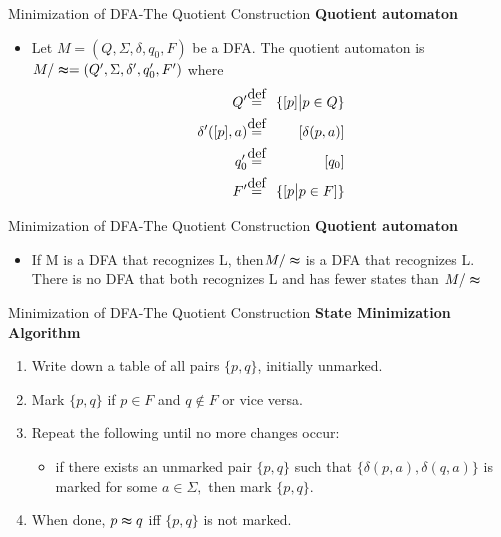 \documentclass{beamer}
\begin{document}
\begin{frame}{Minimization of DFA-The Quotient Construction}
	\textbf{Quotient automaton}
	\begin{itemize}
		\item Let $M = (Q, \Sigma, \delta, q_0, F)$ be a DFA. The quotient automaton is $M / \thickapprox = (Q', \Sigma, \delta', q'_0 , F')$ where
		\begin{eqnarray*}
			Q'&\stackrel{\mathclap{\normalfont\mbox{def}}}{=}& \{ [p]\big| p\in Q \}\\
			\delta'([p],a)&\stackrel{\mathclap{\normalfont\mbox{def}}}{=}& [\delta(p,a)]\\
			q_0'&\stackrel{\mathclap{\normalfont\mbox{def}}}{=}& [q_0]\\
			F'&\stackrel{\mathclap{\normalfont\mbox{def}}}{=}& \{[p \big| p\in F]\}
		\end{eqnarray*}
	\end{itemize}
\end{frame}
\begin{frame}{Minimization of DFA-The Quotient Construction}
	\textbf{Quotient automaton}
	\begin{itemize}
		\item If M is a DFA that recognizes L, then$M/\thickapprox$  is a DFA that recognizes L. There is no DFA that both recognizes L and has fewer states than $M/\thickapprox$
	\end{itemize}
\end{frame}
\begin{frame}{Minimization of DFA-The Quotient Construction}
	\textbf{State Minimization Algorithm}
	\begin{enumerate}
		\item Write down a table of all pairs $\{p, q\}$, initially unmarked.
		\item Mark $\{p, q\}$ if $p \in F$ and $q \notin F$ or vice versa.
		\item Repeat the following until no more changes occur: 
		\begin{itemize}
			\item if there exists an unmarked pair $\{p, q\}$ such that $\{\delta(p, a), \delta(q, a)\}$ is marked for some $a \in \Sigma,$
			then mark $\{p, q\}$.
		\end{itemize}
		\item When done, $p \thickapprox q$ iff $\{p, q\}$ is not marked.
	\end{enumerate}


\end{frame}
\end{document}

